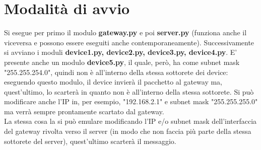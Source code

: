 \documentclass[a4paper, 14pt]{extreport}
\begin{document}
    \chapter{Modalità di avvio}
    Si esegue per primo il modulo \textbf{gateway.py} e poi \textbf{server.py} 
    (funziona anche il viceversa e possono essere eseguiti anche contemporaneamente).
    Successivamente si avviano i moduli \textbf{device1.py, device2.py, device3.py, device4.py}.
    E' presente anche un modulo \textbf{device5.py}, il quale, però, ha come subnet mask
    "255.255.254.0", quindi non è all'interno della stessa sottorete dei device:
    eseguendo questo modulo, il device invierà il pacchetto al gateway
    ma, quest'ultimo, lo scarterà in quanto non è all'interno della stessa sottorete.
    Si può modificare anche l'IP in, per esempio, "192.168.2.1" e subnet mask "255.255.255.0"
    ma verrà sempre prontamente scartato dal gateway. \\
    La stessa cosa la si può emulare modificando l'IP e/o subnet mask dell'interfaccia del gateway rivolta verso il server 
    (in modo che non faccia più parte della stessa sottorete del server), quest'ultimo scarterà il messaggio.
\end{document}
